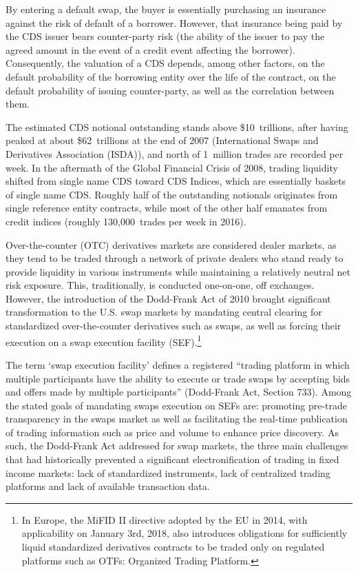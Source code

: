 By entering a default swap, the buyer is essentially purchasing an insurance against the risk of default of a borrower. However, that insurance being paid by the CDS issuer bears counter-party risk (the ability of the issuer to pay the agreed amount in the event of a credit event affecting the borrower). Consequently, the valuation of a CDS depends, among other factors, on the default probability of the borrowing entity over the life of the contract, on the default probability of issuing counter-party, as well as the correlation between them.


The estimated CDS notional outstanding stands above \$10~trillions, after having peaked at about \$62~trillions at the end of 2007 (International Swaps and Derivatives Association (ISDA)), and north of 1~million trades are recorded per week. In the aftermath of the Global Financial Crisis of 2008, trading liquidity shifted from single name CDS toward CDS Indices, which are essentially baskets of single name CDS. Roughly half of the outstanding notionals originates from single reference entity contracts, while most of the other half emanates from credit indices (roughly 130,000~trades per week in 2016).


Over-the-counter (OTC) derivatives markets are considered dealer markets, as they tend to be traded through a network of private dealers who stand ready to provide liquidity in various instruments while maintaining a relatively neutral net risk exposure. This, traditionally, is conducted one-on-one, off exchanges. However, the introduction of the Dodd-Frank Act of 2010 brought significant transformation to the U.S. swap markets by mandating central clearing for standardized over-the-counter derivatives such as swaps, as well as forcing their execution on a swap execution facility (SEF).\footnote{In Europe, the MiFID II directive adopted by the EU in 2014, with applicability on January 3rd, 2018, also introduces obligations for sufficiently liquid standardized derivatives contracts to be traded only on regulated platforms such as OTFs: Organized Trading Platform.}


The term `swap execution facility' defines a registered ``trading platform in which multiple participants have the ability to execute or trade swaps by accepting bids and offers made by multiple participants'' (Dodd-Frank Act, Section 733). Among the stated goals of mandating swaps execution on SEFs are: promoting pre-trade transparency in the swaps market as well as facilitating the real-time publication of trading information such as price and volume to enhance price discovery. As such, the Dodd-Frank Act addressed for swap markets, the three main challenges that had historically prevented a significant electronification of trading in fixed income markets: lack of standardized instruments, lack of centralized trading platforms and lack of available transaction data.


